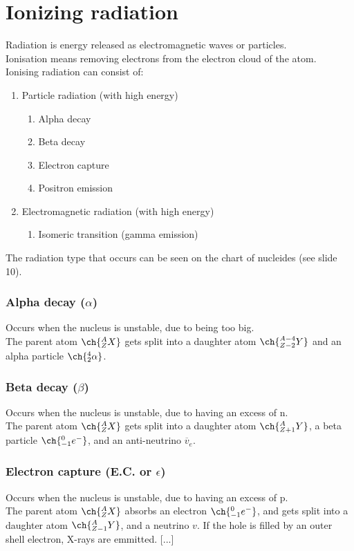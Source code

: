 \section{Ionizing radiation}
Radiation is energy released as electromagnetic waves or particles. \\
Ionisation means removing electrons from the electron cloud of the atom. \\
Ionising radiation can consist of:
 \begin{enumerate}
	\item Particle radiation (with high energy)
	 \begin{enumerate}
		\item Alpha decay
		\item Beta decay
		\item Electron capture
		\item Positron emission
	\end{enumerate}
	 \item Electromagnetic radiation (with high energy)
	 \begin{enumerate}
		\item Isomeric transition (gamma emission)
	\end{enumerate}	 
\end{enumerate}
The radiation type that occurs can be seen on the chart of nucleides (see slide 10). 
\subsubsection{Alpha decay ($\alpha$)}
Occurs when the nucleus is unstable, due to being too big.\\
The parent atom $\ch{^{A}_{Z}X}$ gets split into a daughter atom $\ch{^{A-4}_{Z-2}Y}$ and an alpha particle $\ch{^{4}_{2}\alpha}$.
\subsubsection{Beta decay ($\beta$)}
Occurs when the nucleus is unstable, due to having an excess of n.\\
The parent atom $\ch{^{A}_{Z}X}$ gets split into a daughter atom $\ch{^{A}_{Z+1}Y}$, a beta particle $\ch{^{0}_{-1}e^{-}}$, and an anti-neutrino $\overline{v}_e$.
\subsubsection{Electron capture (E.C. or $\epsilon$)}
Occurs when the nucleus is unstable, due to having an excess of p.\\
The parent atom $\ch{^{A}_{Z}X}$ absorbs an electron $\ch{^{0}_{-1}e^{-}}$, and gets split into a daughter atom $\ch{^{A}_{Z-1}Y}$, and a neutrino $v$.
If the hole is filled by an outer shell electron, X-rays are emmitted.
[...]
